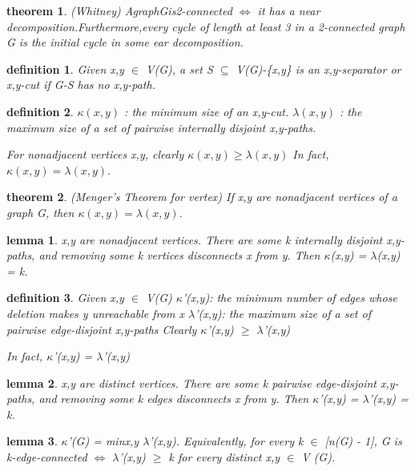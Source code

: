 \documentclass[twocolumn]{article}
\newtheorem{theorem}{theorem}[section]  %
\newtheorem{definition}{definition}
\newtheorem{lemma}{lemma}
\begin{document}
\begin{CJK*}{UTF8}{bkai}
    \begin{theorem}{(Whitney)}
        AgraphGis2-connected $\iff$ it has a near decomposition.Furthermore,every
 cycle of length at least 3 in a 2-connected graph G is the initial cycle in some
 ear decomposition.
    \end{theorem}

    \begin{definition}
         Given x,y $\in$ V(G), a set S $\subseteq $ V(G)-\{x,y\} is an x,y-separator or x,y-cut if
 G-S has no x,y-path.
    \end{definition}

    \begin{definition}
        $\kappa (x , y)$ : the minimum size of an x,y-cut.
        $\lambda (x , y)$ :  the maximum size of a set of pairwise internally disjoint x,y-paths.

        For nonadjacent vertices x,y, clearly $\kappa(x,y) \geq \lambda (x,y)$
 In fact, $\kappa(x,y) = \lambda(x,y).$
    \end{definition}

    \begin{theorem}{(Menger's Theorem for vertex)}
         If x,y are nonadjacent vertices of a graph G, then $\kappa(x,y) = \lambda(x,y)$.
    \end{theorem}

    \begin{lemma}
         x,y are nonadjacent vertices. There are some k internally disjoint x,y-paths,
 and removing some k vertices disconnects x from y. Then
 $\kappa$(x,y) = $\lambda$(x,y) = k.
    \end{lemma}

    \begin{definition}
        Given x,y $\in$ V(G)
 $\kappa$'(x,y): the minimum number of edges whose deletion makes y unreachable
 from x
 $\lambda$'(x,y): the maximum size of a set of pairwise edge-disjoint x,y-paths
 Clearly $\kappa$'(x,y) $\geq$ $\lambda$'(x,y)

  In fact, $\kappa$'(x,y) = $\lambda$'(x,y)
    \end{definition}

    \begin{lemma}
        x,y are distinct vertices. There are some k pairwise edge-disjoint x,y-paths,
 and removing some k edges disconnects x from y. Then $\kappa$'(x,y) = $\lambda$'(x,y) = k.
    \end{lemma}

    \begin{lemma}
         $\kappa$'(G) = minx,y $\lambda$'(x,y). Equivalently, for every k $\in$ [n(G) - 1], G is
 k-edge-connected $\iff$ $\lambda$'(x,y) $\geq$ k for every distinct x,y $\in$ V (G).
    \end{lemma}


\end{CJK*}
\end{document}
